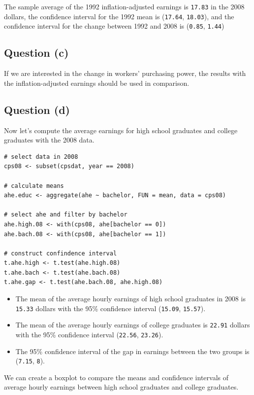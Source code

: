 \documentclass[a4paper,11pt]{article}
\begin{document}
The sample average of the 1992 inflation-adjusted earnings is
\texttt{17.83} in the 2008 dollars, the confidence
interval for the 1992 mean is
(\texttt{17.64},
\texttt{18.03}), and the confidence
interval for the change between 1992 and 2008 is
(\texttt{0.85},
\texttt{1.44})

\subsection*{Question (c)}
\label{sec:orgf7918ec}

If we are interested in the change in workers' purchasing power, the
results with the inflation-adjusted earnings should be used in
comparison.

\subsection*{Question (d)}
\label{sec:orga1829ee}

Now let's compute the average earnings for high school graduates and
college graduates with the 2008 data.

\begin{verbatim}
# select data in 2008
cps08 <- subset(cpsdat, year == 2008)

# calculate means
ahe.educ <- aggregate(ahe ~ bachelor, FUN = mean, data = cps08)

# select ahe and filter by bachelor
ahe.high.08 <- with(cps08, ahe[bachelor == 0])
ahe.bach.08 <- with(cps08, ahe[bachelor == 1])

# construct confindence interval
t.ahe.high <- t.test(ahe.high.08)
t.ahe.bach <- t.test(ahe.bach.08)
t.ahe.gap <- t.test(ahe.bach.08, ahe.high.08)
\end{verbatim}

\begin{itemize}
\item The mean of the average hourly earnings of high school graduates in
2008 is \texttt{15.33} dollars with the 95\%
confidence interval (\texttt{15.09},
\texttt{15.57}).
\item The mean of the average hourly earnings of college graduates is
\texttt{22.91} dollars with the 95\%
confidence interval (\texttt{22.56},
\texttt{23.26}).
\item The 95\% confidence interval of the gap in earnings between the two
groups is (\texttt{7.15},
\texttt{8}).
\end{itemize}

We can create a boxplot to compare the means and confidence intervals
of average hourly earnings between high school graduates and college
graduates.
\end{document}
